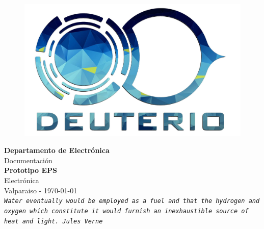 \setlength{\unitlength}{1 cm} %
\thispagestyle{empty}

\vspace*{-1in}
\begin{figure}[htb]
\begin{center}
\includegraphics[width=12cm]{./figures/deutlogo.png}
\end{center}
\end{figure}

\begin{center}
\textbf{
{\LARGE Departamento de Electr\'onica}}\\[1.25cm]
{\Large Documentación}\\[1.3cm]
{\LARGE \textbf{Prototipo EPS}}\\[2.5cm]
{\large Electrónica }\\[1cm]
Valparaiso - \today
\\[2cm]
{\texttt{\textit{Water eventually would be employed as a fuel and that the hydrogen and oxygen which constitute it would furnish an inexhaustible source of heat and light. Jules Verne}}}
\end{center}
